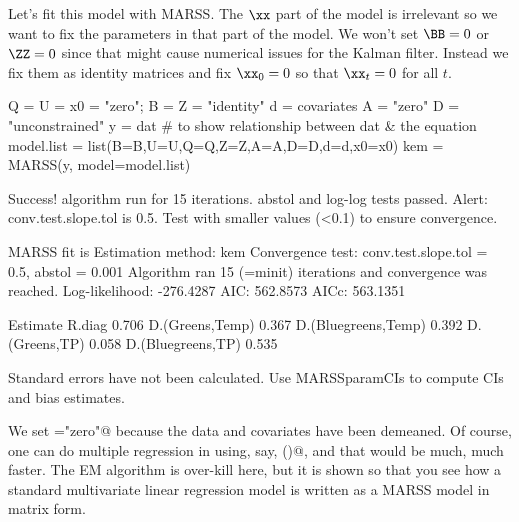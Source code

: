 Let's fit this model with MARSS.  The $\xx$ part of the model is irrelevant so we want to fix the parameters in that part of the model.  We won't set $\BB=0$ or $\ZZ=0$ since that might cause numerical issues for the Kalman filter. Instead we fix them as identity matrices and fix $\xx_0=0$ so that $\xx_t=0$ for all $t$.
\begin{Schunk}
\begin{Sinput}
 Q = U = x0 = "zero"; B = Z = "identity"
 d = covariates
 A = "zero"
 D = "unconstrained"
 y = dat # to show relationship between dat & the equation
 model.list = list(B=B,U=U,Q=Q,Z=Z,A=A,D=D,d=d,x0=x0)
 kem = MARSS(y, model=model.list)
\end{Sinput}
\begin{Soutput}
Success! algorithm run for 15 iterations. abstol and log-log tests passed.
Alert: conv.test.slope.tol is 0.5.
Test with smaller values (<0.1) to ensure convergence.

MARSS fit is
Estimation method: kem 
Convergence test: conv.test.slope.tol = 0.5, abstol = 0.001
Algorithm ran 15 (=minit) iterations and convergence was reached. 
Log-likelihood: -276.4287 
AIC: 562.8573   AICc: 563.1351   
 
                    Estimate
R.diag                 0.706
D.(Greens,Temp)        0.367
D.(Bluegreens,Temp)    0.392
D.(Greens,TP)          0.058
D.(Bluegreens,TP)      0.535

Standard errors have not been calculated. 
Use MARSSparamCIs to compute CIs and bias estimates.
\end{Soutput}
\end{Schunk}
We set \verb@A="zero"@ because the data and covariates have been demeaned.   Of course, one can do multiple regression in \R using, say, \verb@lm()@, and that would be much, much faster.  The EM algorithm is over-kill here, but it is shown so that you see how a standard multivariate linear regression model is written as a MARSS model in matrix form.


